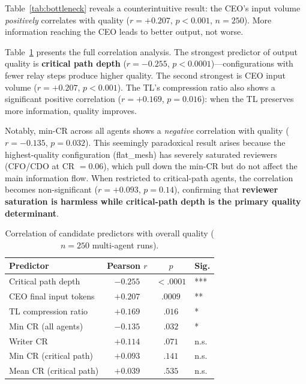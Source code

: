 \documentclass[conference]{IEEEtran}
\begin{document}
Table~\ref{tab:bottleneck} reveals a counterintuitive result: the CEO's input volume \emph{positively} correlates with quality ($r = +0.207$, $p < 0.001$, $n = 250$).
More information reaching the CEO leads to better output, not worse.

Table~\ref{tab:correlations} presents the full correlation analysis.
The strongest predictor of output quality is \textbf{critical path depth} ($r = -0.255$, $p < 0.0001$)---configurations with fewer relay steps produce higher quality.
The second strongest is CEO input volume ($r = +0.207$, $p < 0.001$).
The TL's compression ratio also shows a significant positive correlation ($r = +0.169$, $p = 0.016$): when the TL preserves more information, quality improves.

Notably, min-CR across all agents shows a \emph{negative} correlation with quality ($r = -0.135$, $p = 0.032$).
This seemingly paradoxical result arises because the highest-quality configuration (flat\_mesh) has severely saturated reviewers (CFO/CDO at CR $= 0.06$), which pull down the min-CR but do not affect the main information flow.
When restricted to critical-path agents, the correlation becomes non-significant ($r = +0.093$, $p = 0.14$), confirming that \textbf{reviewer saturation is harmless while critical-path depth is the primary quality determinant}.

\begin{table}[t]
\centering
\caption{Correlation of candidate predictors with overall quality ($n = 250$ multi-agent runs).}
\label{tab:correlations}
\small
\begin{tabular}{lccl}
\toprule
\textbf{Predictor} & \textbf{Pearson} $r$ & $p$ & \textbf{Sig.} \\
\midrule
Critical path depth       & $-0.255$ & $< .0001$ & *** \\
CEO final input tokens    & $+0.207$ & $.0009$   & ** \\
TL compression ratio      & $+0.169$ & $.016$    & * \\
Min CR (all agents)       & $-0.135$ & $.032$    & * \\
Writer CR                 & $+0.114$ & $.071$    & n.s. \\
Min CR (critical path)    & $+0.093$ & $.141$    & n.s. \\
Mean CR (critical path)   & $+0.039$ & $.535$    & n.s. \\
\bottomrule
\end{tabular}
\end{table}
\end{document}
